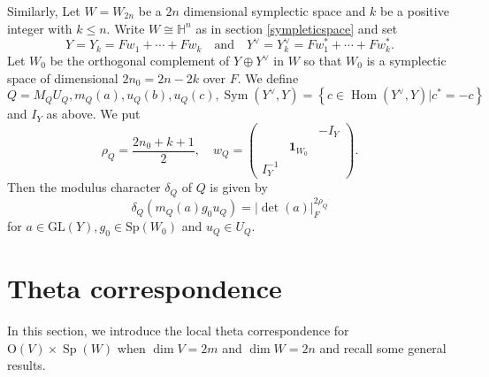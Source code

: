 \documentclass[article]{article}
\numberwithin{equation}{section}
\theoremstyle{definition}
\DeclareMathOperator{\Hom}{Hom}
\DeclareMathOperator{\SP}{Sp}
\begin{document}
Similarly, Let $W=W_{2n}$ be a $2n$ dimensional symplectic space and  $k$ be a positive integer with $k\leq n$. Write $W\cong \mathbb H^n$ as in section \ref{sympleticspace} and set 
$$
Y=Y_k=Fw_1+\cdots+Fw_k \quad \mbox{and}\quad Y^\vee=Y_k^\vee=Fw_1^*+\cdots+Fw_k^*.
$$
Let $W_0$ be the orthogonal complement of $Y \oplus Y^{\vee}$ in $W$ so that $W_0$ is a symplectic space of dimensional $2n_0=2n-2k$ over $F$. We define $Q=M_{Q} U_{Q}, m_{Q}(a), u_{Q}(b), u_{Q}(c), \operatorname{Sym}\left(Y^{\vee}, Y\right)=\left\{c \in \Hom(Y^{\vee}, Y) | c^{*}=-c\right\}$ and $I_Y$ as above. We put  
$$\rho_{Q}=\frac{2n_0+k+1}{2}, \quad w_{Q}=\left(\begin{array}{ccc}
{} &{}& -I_{Y} \\ 
{} &\mathbf 1_{W_0} & {}\\
{I_{Y}^{-1}}&{}& 
\end{array}\right).$$
Then the modulus character $\delta_{Q}$ of $Q$ is given by
$$\delta_{Q}\left(m_{Q}(a) g_0 u_{Q}\right)=|\operatorname{det}(a)|_{F}^{2 \rho_{Q}}$$
for $a \in \mathrm{GL}(Y), g_0 \in \mathrm{Sp}(W_0)$ and $u_{Q} \in U_{Q}$.








\section{Theta correspondence}
In this section, we introduce the local theta correspondence for $\mathrm O(V)\times \SP(W)$ when $\dim V=2m$ and $\dim W=2n$ and recall some general results. 
\end{document}
